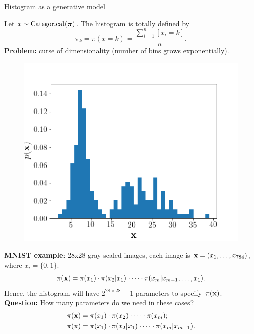 \begin{frame}{Histogram as a generative model}
	
	\begin{minipage}[t]{0.6\columnwidth}
	    Let $x \sim \text{Categorical}(\boldsymbol{\pi})$. The histogram is totally defined by
		\[
		    \pi_k = \pi(x = k) = \frac{\sum_{i=1}^n [x_i = k]}{n}.
		\]
		\textbf{Problem:} curse of dimensionality (number of bins grows exponentially). \\
		\end{minipage}%
		\begin{minipage}[t]{0.4\columnwidth}
	    \begin{figure}[h]
	        \centering
	        \includegraphics[width=\linewidth]{figs/histogram.png}
	    \end{figure}
	\end{minipage}
	\textbf{MNIST example}: 28x28 gray-scaled images, each image is $\mathbf{x} = (x_1, \dots, x_{784})$, where $x_i = \{0, 1\}$. 
	\[
	    \pi(\mathbf{x}) = \pi(x_1) \cdot \pi(x_2 | x_1) \cdot \dots \cdot \pi(x_m | x_{m-1}, \dots, x_1).
	\]
	Hence, the histogram will have $2^{28 \times 28} - 1$ parameters to specify~$\pi(\mathbf{x})$. \\
	\textbf{Question:} How many parameters do we need in these cases?
	\begin{align*}
	    \pi(\mathbf{x}) &= \pi(x_1) \cdot \pi(x_2)\cdot \dots \cdot \pi(x_m); \\
	    \pi(\mathbf{x}) &= \pi(x_1) \cdot \pi(x_2 | x_1) \cdot \dots \cdot \pi(x_m | x_{m-1}).
	\end{align*}
\end{frame}
